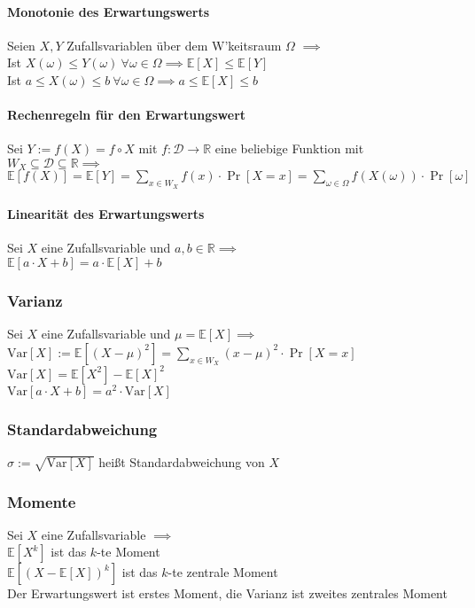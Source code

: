 \documentclass[a4paper,9pt]{extarticle}
\newcommand{\Var}{\text{Var}}
\begin{document}
\paragraph*{Monotonie des Erwartungswerts}
Seien $X, Y$ Zufallsvariablen über dem W'keitsraum $\Omega$ $\implies$\\ 
Ist $X(\omega) ≤ Y(\omega) ~\forall \omega \in \Omega \implies \mathbb{E}[X] ≤ \mathbb{E}[Y]$ \\
Ist $a ≤ X(\omega) ≤ b ~\forall \omega \in \Omega \implies a ≤ \mathbb{E}[X] ≤ b$

\paragraph*{Rechenregeln für den Erwartungswert}
Sei $Y := f(X) = f \circ X$ mit $ f : \mathcal{D} → \mathbb{R}$ eine beliebige Funktion mit $W_X \subseteq \mathcal{D} \subseteq \mathbb{R} \implies$ \\
$\mathbb{E}[f(X)] = \mathbb{E}[Y] = \sum_{x \in W_X} f(x) ⋅ \Pr[X = x] = \sum_{\omega \in \Omega} f(X(\omega)) ⋅ \Pr[\omega]$ \\

\paragraph*{Linearität des Erwartungswerts}
Sei $X$ eine Zufallsvariable und $a,b \in \mathbb{R} \implies$ \\
$\mathbb{E}[a ⋅ X + b] = a ⋅ \mathbb{E}[X] + b$

\subsubsection*{Varianz}
Sei $X$ eine Zufallsvariable und $\mu = \mathbb{E}[X] \implies$ \\
$\Var[X] := \mathbb{E}[(X - \mu)^2] = \sum_{x \in W_X} (x - \mu)^2 ⋅ \Pr[X = x]$ \\
$\Var[X] = \mathbb{E}[X^2] - \mathbb{E}[X]^2$ \\
$\Var[a ⋅ X + b] = a^2 ⋅ \Var[X]$

\subsubsection*{Standardabweichung}
$\sigma := \sqrt{\Var[X]}$ heißt Standardabweichung von $X$

\subsubsection*{Momente}
Sei $X$ eine Zufallsvariable $\implies$ \\
$\mathbb{E}[X^k]$ ist das $k$-te Moment \\
$\mathbb{E}[(X - \mathbb{E}[X])^k]$ ist das $k$-te zentrale Moment \\
Der Erwartungswert ist erstes Moment, die Varianz ist zweites zentrales Moment
\end{document}
